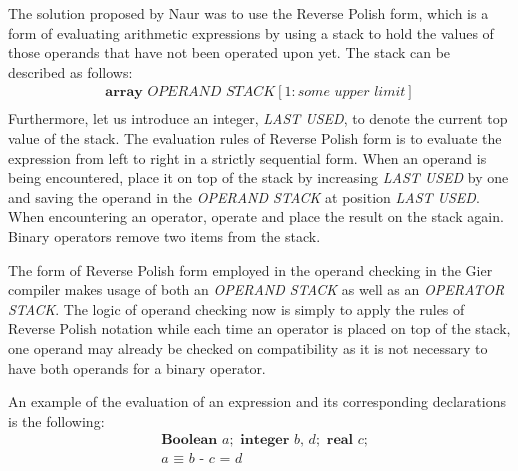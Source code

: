 \documentclass{article}
\begin{document}
The solution proposed by Naur was to use the Reverse Polish form, which is a form of evaluating arithmetic expressions by using a stack to hold the values of those operands that have not been operated upon yet. The stack can be described as follows:
\\
\begin{equation} \label{eq6}
	\begin{split}
		\textbf{array} \textit{ OPERAND STACK}[1:\textit{some upper limit}]\\
	\end{split}
\end{equation}
Furthermore, let us introduce an integer, \textit{LAST USED}, to denote the current top value of the stack. The evaluation rules of Reverse Polish form is to evaluate the expression from left to right in a strictly sequential form. When an operand is being encountered, place it on top of the stack by increasing \textit{LAST USED} by one and saving the operand in the \textit{OPERAND STACK} at position \textit{LAST USED}. When encountering an operator, operate and place the result on the stack again. Binary operators remove two items from the stack.

The form of Reverse Polish form employed in the operand checking in the Gier compiler makes usage of both an \textit{OPERAND STACK} as well as an \textit{OPERATOR STACK}. The logic of operand checking now is simply to apply the rules of Reverse Polish notation while each time an operator is placed on top of the stack, one operand may already be checked on compatibility as it is not necessary to have both operands for a binary operator.

An example of the evaluation of an expression and its corresponding declarations is the following:
\begin{equation} \label{eq7}
	\begin{split}
		&\textbf{Boolean} \textit{ a}; \textbf{ integer } \textit{b, d}; \textbf{ real } \textit{c};\\
		&\textit{a } \equiv \textit{ b - c = d}\\
	\end{split}
\end{equation}
\end{document}
